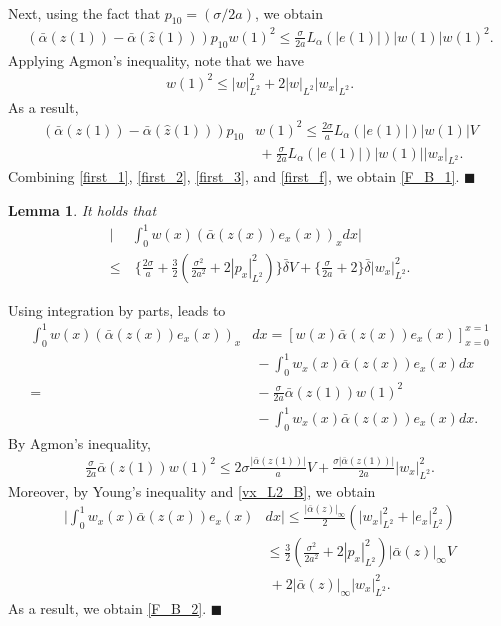 \documentclass[twocolumn]{autart}
\newtheorem{lemm}{Lemma}
\newenvironment{lemma}{\begin{lemm}}{\hfill \end{lemm}}
\newenvironment{proof}{{\it Proof. }}{\hfill $\blacksquare$ }
\begin{document}
\begin{proof}
\begin{align}
\end{align}
Next, using the fact that $p_{10}=(\sigma/2a)$, we obtain 
\begin{align*}
\left(\bar{\alpha}(z(1))-\bar{\alpha}(\hat{z}(1))\right)p_{10}w(1)^2 \leq \frac{\sigma}{2a}L_{\alpha}(|e(1)|)|w(1)|w(1)^2.
\end{align*}
Applying Agmon's inequality, note that we have 
\begin{align*}
w(1)^2 \leq |w|_{L^2}^2+2|w|_{L^2}|w_x|_{L^2}. 
\end{align*}
As a result, 
\begin{align}
\left(\bar{\alpha}(z(1))-\bar{\alpha}(\hat{z}(1))\right)p_{10}&w(1)^2 \leq \frac{2\sigma}{a}L_{\alpha}(|e(1)|)|w(1)| V \nonumber \\
&~+\frac{\sigma}{2a}L_{\alpha}(|e(1)|)|w(1)| |w_x|_{L^2}. \label{first_f}
\end{align}
Combining \eqref{first_1}, \eqref{first_2}, \eqref{first_3}, and \eqref{first_f}, we obtain \eqref{F_B_1}. 
\end{proof}

\begin{lemma}
It holds that 
\begin{align}
\bigg|&\int_{0}^{1}w(x)\left( \bar{\alpha}(z(x))e_x(x)\right)_xdx\bigg| \nonumber \\
\leq&~ \bigg\{\frac{2\sigma }{a}+\frac{3}{2} \left(\frac{\sigma^2}{2a^2}+2|p_x|_{L^2}^2\right)\bigg\}\bar{\delta}V+\bigg\{\frac{\sigma }{2a}+2\bigg\}\bar{\delta}|w_x|_{L^2}^2. \label{F_B_2}
\end{align}
\hfill  
\end{lemma}
\begin{proof}
Using integration by parts, leads to
\begin{align*}
\int_{0}^{1}w(x)\left( \bar{\alpha}(z(x))e_x(x)\right)_x&dx = \left[w(x)\bar{\alpha}(z(x))e_x(x)\right]_{x=0}^{x=1} \nonumber \\
&~-\int_{0}^{1}w_x(x)\bar{\alpha}(z(x))e_x(x)dx \nonumber \\
=&~-\frac{\sigma}{2a}\bar{\alpha}(z(1))w(1)^2\nonumber \\
&~-\int_{0}^{1}w_x(x)\bar{\alpha}(z(x))e_x(x)dx. 
\end{align*}
By Agmon's inequality,
\begin{align*}
\frac{\sigma}{2a}\bar{\alpha}(z(1))w(1)^2 \leq 2\sigma \frac{|\bar{\alpha}(z(1))|}{a}V + \frac{\sigma |\bar{\alpha}(z(1))|}{2a}|w_x|_{L^2}^2. 
\end{align*}
Moreover, by Young's inequality and \eqref{vx_L2_B}, we obtain 
\begin{align}
\bigg|\int_{0}^{1}w_x(x)\bar{\alpha}(z(x))e_x(x)&dx\bigg|\leq \frac{|\bar{\alpha}(z)|_{\infty}}{2}\left(|w_x|_{L^2}^2+|e_x|_{L^2}^2\right) \nonumber \\
&\leq \frac{3}{2} \left(\frac{\sigma^2}{2a^2}+2|p_x|_{L^2}^2\right)|\bar{\alpha}(z)|_{\infty}V \nonumber \\
&~+2|\bar{\alpha}(z)|_{\infty}|w_x|_{L^2}^2. \nonumber 
\end{align}
As a result, we obtain \eqref{F_B_2}. 
\end{proof}
\end{document}
